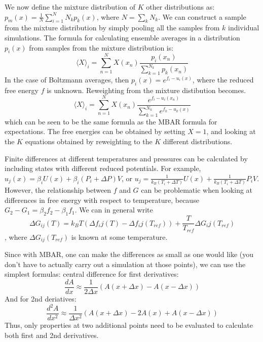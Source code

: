 \documentclass[aps,pre,twocolumn,nofootinbib,superscriptaddress,linenumbers,10pt, draft,tightenlines]{revtex4-1}
\newcounter{comment}
\newcommand{\comment}[2][]{%
\refstepcounter{comment}%
{%
\setstretch{0.7}%
\todo[inline, color={cyan!45},size=\small]{%
\textbf{\footnotesize [\uppercase{#1}\thecomment]:}~#2}%
}}
\begin{document}
We now define the mixture distribution of $K$ other distributions as:
$p_m(x) = \frac{1}{N} \sum_{i=1}^N N_k p_k(x)$, where $N = \sum_k
N_k$.  We can construct a sample from the mixture distribution by
simply pooling all the samples from $k$ individual simulations.
The formula for calculating ensemble averages in a distribution $p_i(x)$
from samples from the mixture distribution is:
\begin{equation}
\langle X \rangle_i = \sum_{n=1}^N X(x_n) \frac{p_i(x_n)}{\sum_{k=1}^{N_k} p_k(x_n)}
\end{equation}
In the case of Boltzmann averages, then $p_i(x) = e^{f_i-u_i(x)}$, where
the reduced free energy $f$ is unknown.  Reweighting from the mixture
distibution becomes.
\begin{equation}
\langle X \rangle_i = \sum_{n=1}^N X(x_n) \frac{e^{f_i - u_i(x_n)}}{\sum_{k=1}^{N_k} e^{f_k - u_k(x)}}
\end{equation}
which can be seen to be the same formula as the MBAR formula for
expectations. The free energies can be obtained by setting $X = 1$, and
looking at the $K$ equations obtained by reweighting to the $K$
different distributions. 

Finite differences at different temperatures and pressures can be
calculated by including states with different reduced potentials. For
example, $u_j(x) = \beta_i U(x) + \beta_i (P_i + \Delta P) V$, or $u_j
= \frac{1}{k_B(T_i + \Delta T)} U(x) + \frac{1}{k_B(T_i + \Delta T)}
P_i V$. However, the relationship between $f$ and $G$ can be
problematic when looking at differences in free energy with respect to
temperature, because $G_2 - G_1 = \beta_2 f_2 - \beta_1 f_1$.  
We can in general write
\[\Delta G_{ij}(T) = k_B T \left (\Delta f_ij(T) - \Delta f_ij(T_{ref})\right) + \frac{T}{T_{ref}}\Delta G_ij(T_{ref})\], 
where $\Delta G_{ij}(T_{ref})$ is known at some temperature.

 

Since with MBAR, one can make the differences as small as one would
like (you don't have to actually carry out a simulation at those
points), we can use the simplest formulas: central difference for
first derivatives:
\[\frac{dA}{dx} \approx \frac{1}{2\Delta x}\left( A(x+\Delta x) - A(x-\Delta x)\right)\]
And for 2nd deriatives:
\[\frac{d^2A}{dx^2} \approx \frac{1}{\Delta x^2}\left( A(x+\Delta x) - 2A(x) + A(x-\Delta x)\right)\]
Thus, only properties at two additional points need to be evaluated to
calculate both first and 2nd derivatives.  
\end{document}

